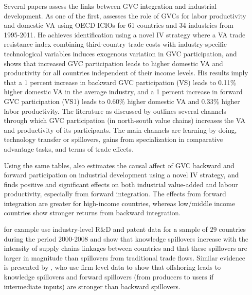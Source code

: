 \documentclass[a4paper]{article}
\begin{document}
Several papers assess the links between GVC integration and industrial development. As one of the first, \citet{Kummritz20161} assesses the role of GVCs for labor productivity and domestic VA using OECD ICIOs for 61 countries and 34 industries from 1995-2011. He achieves identification using a novel IV strategy where a VA trade resistance index combining third-country trade costs with industry-specific technological variables induces exogenous variation in GVC participation, and shows that increased GVC participation leads to higher domestic VA and productivity for all countries independent of their income levels. His results imply that a 1 percent increase in backward GVC participation (VS) leads to 0.11\% higher domestic VA in the average industry, and a 1 percent increase in forward GVC participation (VS1) leads to 0.60\% higher domestic VA and 0.33\% higher labor productivity. The literature as discussed by \citet{Kummritz20161} outlines several channels through which GVC participation (in north-south value chains) increases the VA and productivity of its participants. The main channels are learning-by-doing, technology transfer or spillovers, gains from specialization in comparative advantage tasks, and terms of trade effects. \newline


 Using the same tables, \citep{kummritz20161} also estimates the causal affect of GVC backward and forward participation on industrial development using a novel IV strategy, and finds positive and significant effects on both industrial value-added and labour productivity, especially from forward integration. The effects from forward integration are greater for high-income countries, whereas low/middle income countries show stronger returns from backward integration. \newline %

\citet{piermartini2014knowledge} for example use industry-level R\&D and patent data for a sample of 29 countries during the period 2000-2008 and show that knowledge spillovers increase with the intensity of supply chains linkages between countries and that these spillovers are larger in magnitude than spillovers from traditional trade flows. Similar evidence is presented by \citet{benz2015trade}, who use firm-level data to show that offshoring leads to knowledge spillovers and forward spillovers (from producers to users if intermediate inputs) are stronger than backward spillovers. \newline
\end{document}
